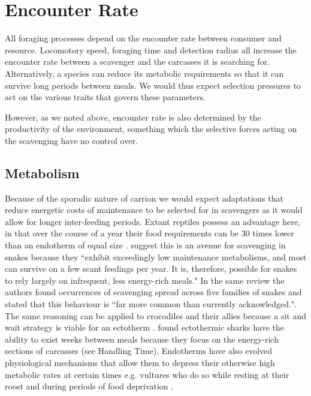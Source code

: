 \documentclass[a4paper,12pt]{article}
\begin{document}
\section*{Encounter Rate}
All foraging processes depend on the encounter rate between consumer and resource. 
Locomotory speed, foraging time and detection radius all increase the encounter rate between a scavenger and the carcasses it is searching for. 
Alternatively, a species can reduce its metabolic requirements so that it can survive long periods between meals. 
We would thus expect selection pressures to act on the various traits that govern these parameters.  

However, as we noted above, encounter rate is also determined by the productivity of the environment, something which the selective forces acting on the scavenging have no control over. 


\subsection*{Metabolism}
Because of the sporadic nature of carrion we would expect adaptations that reduce energetic costs of maintenance to be selected for in scavengers as it would allow for longer inter-feeding periods. 
Extant reptiles possess an advantage here, in that over the course of a year their food requirements can be 30 times lower than an endotherm of equal size \citep{Nagy1621}.
\cite{devault2002scavenging} suggest this is an avenue for scavenging in snakes because they ``exhibit exceedingly low maintenance metabolisms, and most can survive on a few scant feedings per year.
It is, therefore, possible for snakes to rely largely on infrequent, less energy-rich meals."
In the same review the authors found occurrences of scavenging spread across five families of snakes and stated that this behaviour is ``far more common than currently acknowledged."\citep{devault2002scavenging}.
The same reasoning can be applied to crocodiles and their allies because a sit and wait strategy is viable for an ectotherm \citep{forrest2003evidence,moleon2015carcass}. 
\cite{carey1982temperature} found ectothermic sharks have the ability to exist weeks between meals because they focus on the energy-rich sections of carcasses (see Handling Time). 
Endotherms have also evolved physiological mechanisms that allow them to depress their otherwise high metabolic rates at certain times e.g. vultures who do so while resting at their roost and during periods of food deprivation \citep{bahat1998nocturnal}. 
\end{document}

